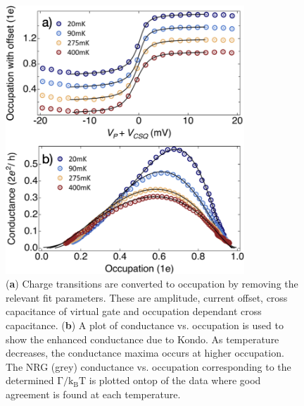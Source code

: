 \begin{figure}[ht]
  \begin{center}
    \includegraphics[width=0.8\textwidth]{figures/ch3/crop_FiguresMaster.014.png}
    \caption[Method to determine occupation and plot conductance vs. occupation]{\label{fig:ch3/cond_vs_occ_gf} 
    (\textbf{a}) Charge transitions are converted to occupation by removing the relevant fit parameters. These are amplitude, current offset, cross capacitance of virtual gate and occupation dependant cross capacitance. (\textbf{b}) A plot of conductance vs. occupation is used to show the enhanced conductance due to Kondo. As temperature decreases, the conductance maxima occurs at higher occupation. The NRG (grey) conductance vs. occupation corresponding to the determined $\mathrm{\Gamma/k_BT}$ is plotted ontop of the data where good agreement is found at each temperature.}
  \end{center}
\end{figure}



